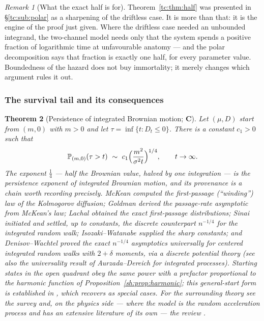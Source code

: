 \documentclass[11pt]{article}
\numberwithin{equation}{section}
\theoremstyle{plain}
\newtheorem{theorem}{Theorem}[section]
\theoremstyle{definition}
\theoremstyle{remark}
\newtheorem{remark}[theorem]{Remark}
\newcommand{\PP}{\mathbb{P}}
\begin{document}
\begin{remark}[What the exact half is for]\label{tc:rem:halfuse}
Theorem~\ref{tc:thm:half} was presented in \S\ref{tc:sub:polar} as a
sharpening of the driftless case. It is more than that: it is the engine of the
proof just given. Where the driftless case needed an unbounded integrand,
the two-channel model needs only that the system spends a positive
fraction of logarithmic time at unfavourable anatomy --- and the polar
decomposition says that fraction is exactly one half, for every
parameter value. Boundedness of the hazard does not buy immortality; it
merely changes which argument rules it out.
\end{remark}

\subsubsection{The survival tail and its consequences}\label{sh:subsub:tail}

\begin{theorem}[Persistence of integrated Brownian motion; \textbf{C}]
\label{sh:thm:persist}
Let $(\mu,D)$ start from $(m,0)$ with $m>0$ and let
$\tau=\inf\{t:D_t\le0\}$. There is a constant $c_1>0$ such that
\begin{equation}\label{sh:eq:persist}
\PP_{(m,0)}(\tau>t)\ \sim\ c_1\Bigl(\frac{m^2}{\sigma^2t}\Bigr)^{1/4},
\qquad t\to\infty .
\end{equation}
The exponent $\tfrac14$ --- half the Brownian value, halved by one
integration --- is the persistence exponent of integrated Brownian
motion, and its provenance is a chain worth recording precisely. McKean
\cite{McK63} computed the first-passage (``winding'') law of the
Kolmogorov diffusion; Goldman \cite{Gol71} derived the passage-rate
asymptotic from McKean's law; Lachal \cite{Lac91} obtained the exact
first-passage distributions; Sinai \cite{Sin92} initiated and settled,
up to constants, the discrete counterpart $n^{-1/4}$ for the integrated
random walk; Isozaki--Watanabe \cite{IW94} supplied the sharp constants;
and Denisov--Wachtel \cite{DW15} proved the exact $n^{-1/4}$ asymptotics
universally for centered integrated random walks with $2+\delta$
moments, via a discrete potential theory (see also the universality
result of Aurzada--Dereich \cite{AD13} for integrated processes).
Starting states in the open quadrant obey the same power with a
prefactor proportional to the harmonic function of
Proposition~\ref{sh:prop:harmonic}; this general-start form is
established in \cite{GJW99}, which recovers \cite{Gol71,IW94} as
special cases. For the surrounding theory see the survey \cite{AS15}
and, on the physics side --- where the model is the \emph{random
acceleration process} and has an extensive literature of its own ---
the review \cite{BMS13}.
\end{theorem}
\end{document}
